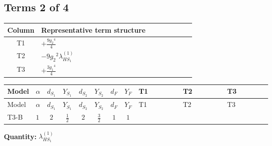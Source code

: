\documentclass[8pt]{article}
\begin{document}
\begin{landscape}
\subsection*{Terms 2 of 4}
\begin{center}
\begin{tabular}{@{}c >{\raggedright\arraybackslash}p{0.82\linewidth}@{}}
\toprule
Column & Representative term structure \\
\midrule
T1 & \(\displaystyle +\frac{9 {g_2}^4}{4}\) \\
\midrule
T2 & \(\displaystyle -9 {g_2}^2 {\lambda_{HS_1}^{(1)}}\) \\
\midrule
T3 & \(\displaystyle +\frac{3 {g_1}^4}{4}\) \\
\midrule
\bottomrule
\end{tabular}
\end{center}
\smallskip
\tiny
\begin{longtable}{@{}llcccccc >{\raggedright\arraybackslash}p{0.21\linewidth} >{\raggedright\arraybackslash}p{0.21\linewidth} >{\raggedright\arraybackslash}p{0.21\linewidth}@{}}
\toprule
Model & $\alpha$ & $d_{S_1}$ & $Y_{S_1}$ & $d_{S_2}$ & $Y_{S_2}$ & $d_F$ & $Y_F$ & T1 & T2 & T3 \\
\midrule
\endfirsthead
\toprule
Model & $\alpha$ & $d_{S_1}$ & $Y_{S_1}$ & $d_{S_2}$ & $Y_{S_2}$ & $d_F$ & $Y_F$ & T1 & T2 & T3 \\
\midrule
\endhead
T3-B & $1$ & $2$ & $\frac{1}{2}$ & $2$ & $\frac{3}{2}$ & $1$ & $1$ & \scriptsize\adjustbox{max width=\linewidth}{$\begin{gathered} +\frac{9 {g_2}^4}{4}\end{gathered}$} & \scriptsize\adjustbox{max width=\linewidth}{$\begin{gathered} -9 {g_2}^2 {\lambda_{HS_1}^{(1)}}\end{gathered}$} & \scriptsize\adjustbox{max width=\linewidth}{$\begin{gathered} +\frac{3 {g_1}^4}{4}\end{gathered}$} \\
\midrule
\bottomrule
\end{longtable}
\clearpage
\noindent\textbf{Quantity: }$\lambda_{HS_1}^{(1)}$\par\smallskip

\end{landscape}
\end{document}
